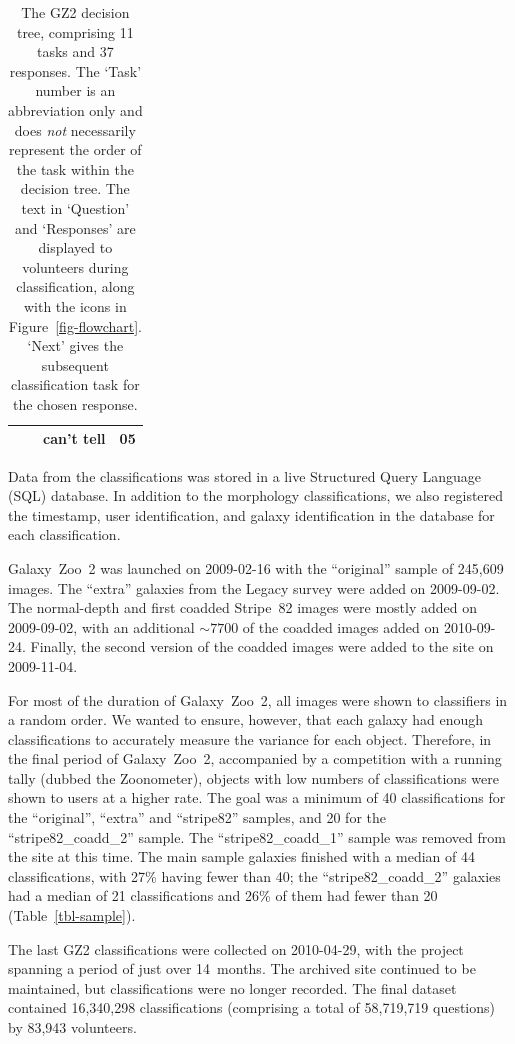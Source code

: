 \documentclass[useAMS,usenatbib]{mn2e}
\begin{document}
\begin{table}
\begin{tabular}{@{}cllr}
      & {\it                               }  & can't tell       & 05 \\
\hline
 \end{tabular}
 \caption{The GZ2 decision tree, comprising 11 tasks and 37 responses. The `Task' number is an abbreviation only and does {\em not} necessarily represent the order of the task within the decision tree. The text in `Question' and `Responses' are displayed to volunteers during classification, along with the icons in Figure~\ref{fig-flowchart}. `Next' gives the subsequent classification task for the chosen response. \label{tbl-tree}}
\end{table}

Data from the classifications was stored in a live Structured Query Language (SQL) database. In addition to the morphology classifications, we also registered the timestamp, user identification, and galaxy identification in the database for each classification. 

Galaxy~Zoo~2 was launched on 2009-02-16 with the ``original'' sample of 245,609 images. The ``extra'' galaxies from the Legacy survey were added on 2009-09-02. The normal-depth and first coadded Stripe~82 images were mostly added on 2009-09-02, with an additional $\sim7700$ of the coadded images added on 2010-09-24. Finally, the second version of the coadded images were added to the site on 2009-11-04. 

For most of the duration of Galaxy~Zoo~2, all images were shown to classifiers in a random order. We wanted to ensure, however, that each galaxy had enough classifications to accurately measure the variance for each object. Therefore, in the final period of Galaxy~Zoo~2, accompanied by a competition with a running tally (dubbed the Zoonometer), objects with low numbers of classifications were shown to users at a higher rate. The goal was a minimum of 40 classifications for the ``original'', ``extra'' and ``stripe82'' samples, and 20 for the ``stripe82\_coadd\_2'' sample. The ``stripe82\_coadd\_1'' sample was removed from the site at this time. The main sample galaxies finished with a median of 44 classifications, with 27\% having fewer than 40; the ``stripe82\_coadd\_2'' galaxies had a median of 21 classifications and 26\% of them had fewer than 20 (Table~\ref{tbl-sample}). 

The last GZ2 classifications were collected on 2010-04-29, with the project spanning a period of just over 14~months. The archived site continued to be maintained, but classifications were no longer recorded. The final dataset contained 16,340,298 classifications (comprising a total of 58,719,719 questions) by 83,943 volunteers.
\end{document}
